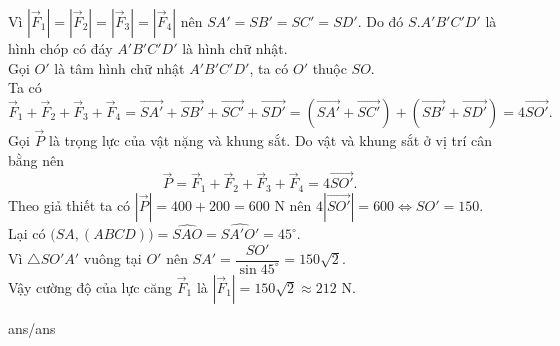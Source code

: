 \begin{ex}
{ Vì $\left|\overrightarrow{F}_1\right| = \left|\overrightarrow{F}_2\right| = \left|\overrightarrow{F}_3\right| = \left|\overrightarrow{F}_4\right|$ nên $SA'=SB'=SC'=SD'$. Do đó $S.A'B'C'D'$ là hình chóp có đáy $A'B'C'D'$ là hình chữ nhật.\\
 Gọi $O'$ là tâm hình chữ nhật $A'B'C'D'$, ta có $O'$ thuộc $SO$.\\
 Ta có
 \[\overrightarrow{F}_1 + \overrightarrow{F}_2 + \overrightarrow{F}_3 + \overrightarrow{F}_4 = \overrightarrow{SA'} + \overrightarrow{SB'} + \overrightarrow{SC'} + \overrightarrow{SD'} = \left(\overrightarrow{SA'} + \overrightarrow{SC'}\right) + \left(\overrightarrow{SB'} + \overrightarrow{SD'}\right) =4\overrightarrow{SO'}.\]
 Gọi $\overrightarrow{P}$ là trọng lực của vật nặng và khung sắt. Do vật và khung sắt ở vị trí cân bằng nên
 \[\overrightarrow{P} = \overrightarrow{F}_1 + \overrightarrow{F}_2 + \overrightarrow{F}_3 + \overrightarrow{F}_4 = 4\overrightarrow{SO'}.\]
 Theo giả thiết ta có $\left|\overrightarrow{P}\right|=400+200=600$ N nên $4\left|\overrightarrow{SO'}\right| =600 \Leftrightarrow SO'=150$.\\
 Lại có $\bigl(SA,(ABCD)\bigr)=\widehat{SAO}=\widehat{SA'O'}=45^\circ$.\\
 Vì $\triangle SO'A'$ vuông tại $O'$ nên $SA'=\dfrac{SO'}{\sin 45^{\circ}}=150\sqrt{2}$.\\
 Vậy cường độ của lực căng $\overrightarrow{F}_1$ là $\left|\overrightarrow{F}_1\right| = 150\sqrt{2}\approx 212$ N.
 }
\end{ex}


 
\begin{indapan}
	{ans/ans\currfilebase}
\end{indapan}

